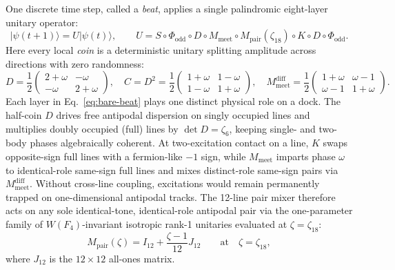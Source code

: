 One discrete time step, called a \emph{beat}, applies a single palindromic eight-layer unitary operator:
\begin{equation}
|\psi(t + 1)\rangle = U |\psi(t)\rangle,
\qquad
U = S \circ \Phi_{\mathrm{odd}} \circ D \circ M_{\mathrm{meet}} \circ M_{\mathrm{pair}}(\zeta_{18}) \circ K \circ D \circ \Phi_{\mathrm{odd}}.
\label{eq:bare-beat}
\end{equation}
Here every local \emph{coin} is a deterministic unitary splitting amplitude across directions with zero randomness:
\begin{equation}
D = \frac{1}{2}\begin{pmatrix} 2 + \omega & -\omega \\ -\omega & 2 + \omega \end{pmatrix},
\quad
C = D^2 = \frac{1}{2}\begin{pmatrix} 1 + \omega & 1 - \omega \\ 1 - \omega & 1 + \omega \end{pmatrix},
\quad
M_{\mathrm{meet}}^{\mathrm{diff}} = \frac{1}{2}\begin{pmatrix} 1 + \omega & \omega - 1 \\ \omega - 1 & 1 + \omega \end{pmatrix}.
\label{eq:local-coins}
\end{equation}
Each layer in Eq.~\eqref{eq:bare-beat} plays one distinct physical role on a dock. The half-coin $D$ drives free
antipodal dispersion on singly occupied lines and multiplies doubly occupied (full) lines by $\det D = \zeta_6$, keeping
single- and two-body phases algebraically coherent. At two-excitation contact on a line, $K$ swaps opposite-sign full
lines with a fermion-like $-1$ sign, while $M_{\mathrm{meet}}$ imparts phase $\omega$ to identical-role same-sign full
lines and mixes distinct-role same-sign pairs via $M_{\mathrm{meet}}^{\mathrm{diff}}$. Without cross-line coupling,
excitations would remain permanently trapped on one-dimensional antipodal tracks. The 12-line pair mixer therefore acts
on any sole identical-tone, identical-role antipodal pair via the one-parameter family of $W(F_4)$-invariant isotropic
rank-1 unitaries evaluated at $\zeta = \zeta_{18}$:
\begin{equation}
M_{\mathrm{pair}}(\zeta) = I_{12} + \frac{\zeta - 1}{12} J_{12}
\qquad\text{at}\quad \zeta = \zeta_{18},
\label{eq:mpair}
\end{equation}
where $J_{12}$ is the $12 \times 12$ all-ones matrix.

